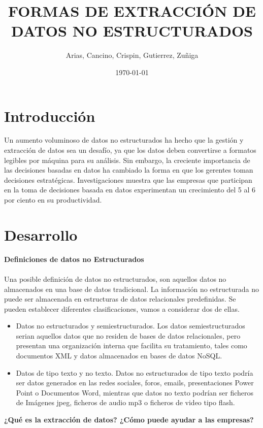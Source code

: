 \documentclass[twoside,twocolumn]{article}
\title{FORMAS DE EXTRACCIÓN DE DATOS NO ESTRUCTURADOS} %
\author{Arias, Cancino, Crispin, Gutierrez, Zuñiga}
\date{\today} %
\begin{document}
\maketitle
\vspace*{5 in}
\section{Introducción}
Un aumento voluminoso de datos no estructurados ha hecho que la gestión y extracción de datos sea un desafío, ya que los datos deben convertirse a formatos legibles por máquina para su análisis. Sin embargo, la creciente importancia de las decisiones basadas en datos ha cambiado la forma en que los gerentes toman decisiones estratégicas. Investigaciones muestra que las empresas que participan en la toma de decisiones basada en datos experimentan un crecimiento del 5 al 6 por ciento en su productividad.
\\
\section{Desarrollo}
\textbf{Definiciones de datos no Estructurados}
\\\\Una posible definición de datos no estructurados, son aquellos datos no almacenados en una base de datos tradicional. La información no estructurada no puede ser almacenada en estructuras de datos relacionales predefinidas.
Se pueden establecer diferentes clasificaciones, vamos a considerar dos de ellas.

\begin{itemize}
    \item Datos no estructurados y semiestructurados. Los datos semiestructurados serian aquellos datos que no residen de bases de datos relacionales, pero presentan una organización interna que facilita su tratamiento, tales como documentos XML y datos almacenados en bases de datos NoSQL.
    \item Datos de tipo texto y no texto. Datos no estructurados de tipo texto podría ser datos generados en las redes sociales, foros, emails, presentaciones Power Point o Documentos Word, mientras que datos no texto podrían ser ficheros de Imágenes jpeg, ficheros de audio mp3 o ficheros de video tipo flash.
\end{itemize}


\textbf{¿Qué es la extracción de datos? ¿Cómo puede ayudar a las empresas?}\\
\end{document}
